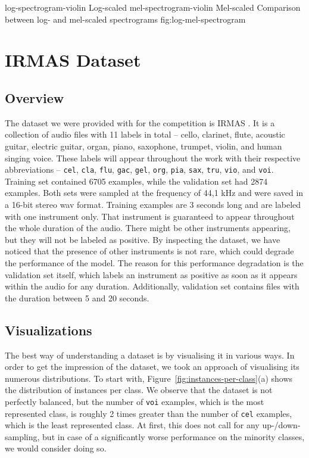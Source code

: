 \asideimages{15cm}{15cm}
	    {log-spectrogram-violin}
	    {Log-scaled}
	    {mel-spectrogram-violin}
	    {Mel-scaled}
	    {Comparison between log- and mel-scaled spectrograms}
	    {fig:log-mel-spectrogram}

\section{IRMAS Dataset}
\label{sec:irmas-dataset}
\subsection{Overview}
\label{sec:irmas-dataset:overview}
The dataset we were provided with for the competition is IRMAS \cite{bosch2012comparison}. It is a collection of audio files with 11 labels in total -- cello, clarinet, flute, acoustic guitar, electric guitar, organ, piano, saxophone, trumpet, violin, and human singing voice. These labels will appear throughout the work with their respective abbreviations -- \texttt{cel}, \texttt{cla}, \texttt{flu}, \texttt{gac}, \texttt{gel}, \texttt{org}, \texttt{pia}, \texttt{sax}, \texttt{tru}, \texttt{vio}, and \texttt{voi}. Training set contained 6705 examples, while the validation set had 2874 examples. Both sets were sampled at the frequency of 44,1 kHz and were saved in a 16-bit stereo wav format. Training examples are 3 seconds long and are labeled with one instrument only. That instrument is guaranteed to appear throughout the whole duration of the audio. There might be other instruments appearing, but they will not be labeled as positive. By inspecting the dataset, we have noticed that the presence of other instruments is not rare, which could degrade the performance of the model. The reason for this performance degradation is the validation set itself, which labels an instrument as positive as soon as it appears within the audio for any duration. Additionally, validation set contains files with the duration between 5 and 20 seconds.

\subsection{Visualizations}
\label{sec:irmas-dataset:visualizations}

The best way of understanding a dataset is by visualising it in various ways. In order to get the impression of the dataset, we took an approach of visualising its numerous distributions. To start with, Figure~\ref{fig:instances-per-class}(a) shows the distribution of instances per class. We observe that the dataset is not perfectly balanced, but the number of \texttt{voi} examples, which is the most represented class, is roughly 2 times greater than the number of \texttt{cel} examples, which is the least represented class. At first, this does not call for any up-/down-sampling, but in case of a significantly worse performance on the minority classes, we would consider doing so. 


